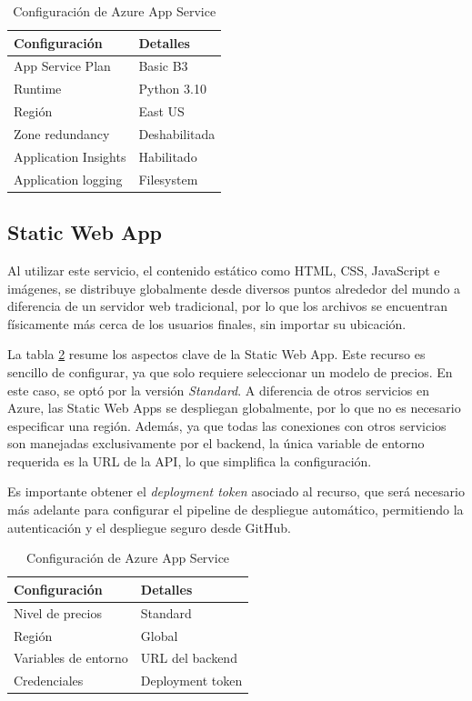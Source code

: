 \begin{table}[h]
	\centering
	\caption[Configuración de Azure App Service]{Configuración de Azure App Service}
	\begin{tabular}{l l}    
		\toprule
		\textbf{Configuración} & \textbf{Detalles} 	\\
		\midrule
		App Service Plan       & Basic B3           \\
		Runtime                & Python 3.10        \\
		Región                 & East US 			\\		
		Zone redundancy        & Deshabilitada		\\
		Application Insights   & Habilitado         \\
		Application logging	   & Filesystem			\\
		\bottomrule
		\hline
	\end{tabular}
	\label{tab:config-app-service}
\end{table}

\subsection{Static Web App}

Al utilizar este servicio, el contenido estático como HTML, CSS, JavaScript e imágenes, se distribuye globalmente desde diversos puntos 
alrededor del mundo a diferencia de un servidor web tradicional, por lo que los archivos se encuentran físicamente más cerca de los usuarios finales,
sin importar su ubicación.

La tabla \ref{tab:config-static-webapp} resume los aspectos clave de la Static Web App. Este recurso es sencillo de configurar, ya que solo requiere seleccionar un modelo de precios. En este caso, se optó por 
la versión \textit{Standard}. A diferencia de otros servicios en Azure, las Static Web Apps se despliegan globalmente, por lo que no es necesario especificar una región. 
Además, ya que todas las conexiones con otros servicios son manejadas exclusivamente por el backend, la única variable de entorno requerida 
es la URL de la API, lo que simplifica la configuración.

Es importante obtener el \textit{deployment token} asociado al recurso, que será necesario más adelante para configurar el pipeline de despliegue automático, 
permitiendo la autenticación y el despliegue seguro desde GitHub.

\begin{table}[h]
	\centering
	\caption[Configuración de Azure App Service]{Configuración de Azure App Service}
	\begin{tabular}{l l}    
		\toprule
		\textbf{Configuración} 	& \textbf{Detalles} \\
		\midrule
		Nivel de precios        & Standard          \\
		Región                  & Global 			\\		
		Variables de entorno    & URL del backend	\\
		Credenciales            & Deployment token  \\
		\bottomrule
		\hline
	\end{tabular}
	\label{tab:config-static-webapp}
\end{table}

